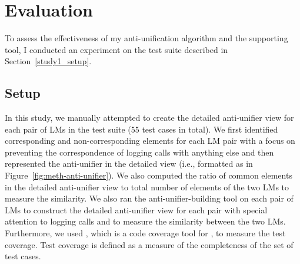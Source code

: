 
\section{Evaluation} \label{anti-unifier-assessment}
To assess the effectiveness of my anti-unification algorithm and the supporting tool, I conducted an experiment on the test suite described in Section~\ref{study1_setup}. %


\subsection{Setup}  \label{study2-setup}
In this study, we manually attempted to create the detailed anti-unifier view for each pair of LMs in the test suite (55 test cases in total). We first identified corresponding and non-corresponding  elements for each LM pair with a focus on preventing the correspondence of logging calls with anything else and then represented the anti-unifier in the detailed view (i.e., formatted as in Figure~\ref{fig:meth-anti-unifier}). We also computed the ratio of common  elements in the detailed anti-unifier view to total number of  elements of the two LMs to measure the similarity.
We also ran the anti-unifier-building tool on each pair of LMs to construct the detailed anti-unifier view for each pair with special attention to logging calls and to measure the similarity between the two LMs. Furthermore, we used , which is a  code coverage tool for , to measure the test coverage. Test coverage is defined as a measure of the completeness of the set of test cases.


